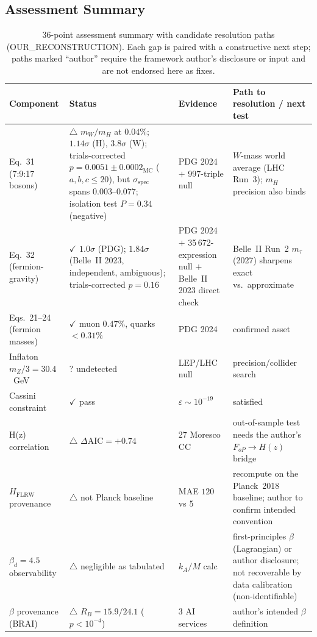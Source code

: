 \documentclass[twocolumn,prd,amsmath,amssymb,floatfix]{revtex4-2}
\begin{document}
\subsection{Assessment Summary}

\begin{table}[tb]
\caption{36-point assessment summary with candidate resolution paths
(OUR\_RECONSTRUCTION). Each gap is paired with a constructive next step;
paths marked ``author'' require the framework author's disclosure or
input and are not endorsed here as fixes.}
\label{tab:summary}
\begin{ruledtabular}
\begin{tabular}{p{2.7cm} p{4.2cm} p{2.1cm} p{4.9cm}}
\hline
Component & Status & Evidence & Path to resolution / next test \\
\hline
Eq.~31 (7:9:17 bosons) & $\triangle$ $m_W/m_H$ at $0.04\%$; $1.14\sigma$ (H), $3.8\sigma$ (W); trials-corrected $p = 0.0051 \pm 0.0002_\mathrm{MC}$ ($a,b,c \le 20$), but $\sigma_\mathrm{spec}$ spans $0.003$--$0.077$; isolation test $P=0.34$ (negative) & PDG 2024 $+$ 997-triple null & $W$-mass world average (LHC Run~3); $m_H$ precision also binds \\
Eq.~32 (fermion-gravity) & $\checkmark$ $1.0\sigma$ (PDG); $1.84\sigma$ (Belle~II 2023, independent, ambiguous); trials-corrected $p = 0.16$ & PDG 2024 $+$ 35\,672-expression null $+$ Belle~II 2023 direct check & Belle~II Run~2 $m_\tau$ (2027) sharpens exact vs.\ approximate \\
Eqs.~21--24 (fermion masses) & $\checkmark$ muon $0.47\%$, quarks $<0.31\%$ & PDG 2024 & confirmed asset \\
Inflaton $m_Z/3 = 30.4$~GeV & ? undetected & LEP/LHC null & precision/collider search \\
Cassini constraint & $\checkmark$ pass & $\varepsilon \sim 10^{-19}$ & satisfied \\
H(z) correlation & $\triangle$ $\Delta\mathrm{AIC}{=}{+}0.74$ & 27 Moresco CC & out-of-sample test needs the author's $F_{oP}\!\to\!H(z)$ bridge \\
$H_\mathrm{FLRW}$ provenance & $\triangle$ not Planck baseline & MAE $120$ vs $5$ & recompute on the Planck~2018 baseline; author to confirm intended convention \\
$\beta_d = 4.5$ observability & $\triangle$ negligible as tabulated & $k_A/M$ calc & first-principles $\beta$ (Lagrangian) or author disclosure; not recoverable by data calibration (non-identifiable) \\
$\beta$ provenance (BRAI) & $\triangle$ $R_B{=}15.9/24.1$ ($p{<}10^{-4}$) & 3 AI services & author's intended $\beta$ definition \\

\end{tabular}
\end{ruledtabular}
\end{table}
\end{document}

